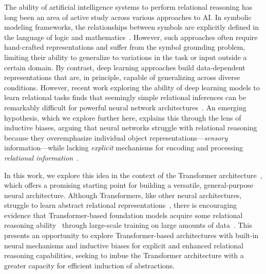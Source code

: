 The ability of artificial intelligence systems to perform relational reasoning has long been an area of active study across various approaches to AI. In symbolic modeling frameworks, the relationships between symbols are explicitly defined in the language of logic and mathematics~\citep{newell1980physical,harnad1990symbol,fodor1988connectionism}. However, such approaches often require hand-crafted representations and suffer from the symbol grounding problem, limiting their ability to generalize to variations in the task or input outside a certain domain. By contrast, deep learning approaches build data-dependent representations that are, in principle, capable of generalizing across diverse conditions. However, recent work exploring the ability of deep learning models to learn relational tasks finds that seemingly simple relational inferences can be remarkably difficult for powerful neural network architectures~\citep{lake2018generalization,barrett2018measuring,hill2018learning,webbEmergentSymbolsBinding2021,santoroSimpleNeuralNetwork2017,shanahanExplicitlyRelationalNeurala,kergNeuralArchitectureInductive2022,altabaa2024abstractors,altabaaLearningHierarchicalRelational2024}. An emerging hypothesis, which we explore further here, explains this through the lens of inductive biases, arguing that neural networks struggle with relational reasoning because they overemphasize individual object representations---\textit{sensory} information---while lacking \textit{explicit} mechanisms for encoding and processing \textit{relational information}~\citep{webbRelationalBottleneckInductive2024}.

In this work, we explore this idea in the context of the Transformer architecture~\citep{vaswani2017attention}, which offers a promising starting point for building a versatile, general-purpose neural architecture. Although Transformers, like other neural architectures, struggle to learn abstract relational representations~\citep{santoroSimpleNeuralNetwork2017,shanahanExplicitlyRelationalNeurala,kergNeuralArchitectureInductive2022,altabaa2024abstractors,altabaaLearningHierarchicalRelational2024}, there is encouraging evidence that Transformer-based foundation models acquire some relational reasoning ability~\citep{wei2022chain,kojima2022large,valmeekam2022large,huang2023reasoninglargelanguagemodels,webb2023emergent,huang2024largelanguagemodelsselfcorrect,mirzadeh2024gsmsymbolicunderstandinglimitationsmathematical} through large-scale training on large amounts of data~\citep{brown2020languagemodelsfewshotlearners,kaplan2020scalinglawsneurallanguage,hoffmann2022trainingcomputeoptimallargelanguage,grattafiori2024llama3herdmodels}. This presents an opportunity to explore Transformer-based architectures with built-in neural mechanisms and inductive biases for explicit and enhanced relational reasoning capabilities, seeking to imbue the Transformer architecture with a greater capacity for efficient induction of abstractions.

